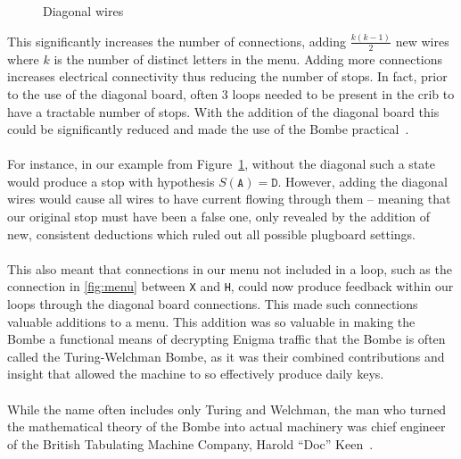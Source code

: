 \begin{figure}[H]
\begin{center}
  \end{center}
  \caption{Diagonal wires}
  \label{fig:diagonal}
\end{figure}
\noindent This significantly increases the number of connections,
adding $\frac{k(k-1)}{2}$ new wires where $k$ is the number of
distinct letters in the menu. Adding more connections increases electrical
connectivity thus reducing the number of stops. In fact, prior to the
use of the diagonal board, often $3$ loops needed to be present in
the crib to have a tractable number of stops. With the addition of
the diagonal board this could be significantly reduced and made the
use of the Bombe practical~\cite{Davies2010}.
\\\\For instance, in our example from Figure~\ref{fig:diagonal},
without the diagonal such a state would produce a stop with
hypothesis $S(\texttt{A}) = \texttt{D}$. However, adding the diagonal
wires would cause all wires to have current flowing through them --
meaning that our original stop must have been a false one, only
revealed by the addition of new, consistent deductions which ruled
out all possible plugboard settings.
\\\\This also meant that connections in our menu not included in a
loop, such as the connection in \ref{fig:menu} between \texttt{X} and
\texttt{H}, could now produce feedback within our loops through the
diagonal board connections. This made such connections valuable
additions to a menu. This addition was so valuable in making the
Bombe a functional means of decrypting Enigma traffic that the Bombe
is often called the Turing-Welchman Bombe, as it was their combined
contributions and insight that allowed the machine to so effectively
produce daily keys.
\\\\While the name often includes only Turing and Welchman, the man
who turned the mathematical theory of the Bombe into actual machinery
was chief engineer of the British Tabulating Machine Company, Harold
``Doc'' Keen~\cite[p.~81]{Welchman1982HutSix}.

